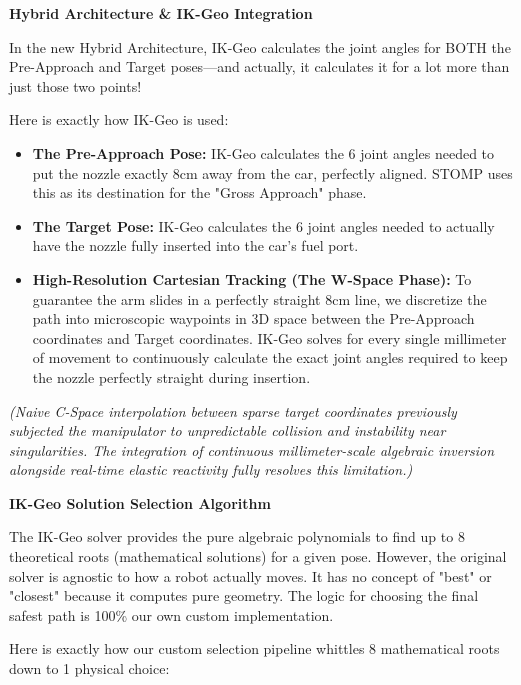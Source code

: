 \documentclass[11pt, a4paper]{article}
\begin{document}
\vspace{0.4cm}
{\Large\textbf{Hybrid Architecture \& IK-Geo Integration}}

In the new Hybrid Architecture, IK-Geo calculates the joint angles for BOTH the Pre-Approach and Target poses—and actually, it calculates it for a lot more than just those two points!

Here is exactly how IK-Geo is used:

\begin{itemize}
    \item \textbf{The Pre-Approach Pose:} IK-Geo calculates the 6 joint angles needed to put the nozzle exactly 8cm away from the car, perfectly aligned. STOMP uses this as its destination for the "Gross Approach" phase.
    \item \textbf{The Target Pose:} IK-Geo calculates the 6 joint angles needed to actually have the nozzle fully inserted into the car's fuel port.
    \item \textbf{High-Resolution Cartesian Tracking (The W-Space Phase):} To guarantee the arm slides in a perfectly straight 8cm line, we discretize the path into microscopic waypoints in 3D space between the Pre-Approach coordinates and Target coordinates. IK-Geo solves for every single millimeter of movement to continuously calculate the exact joint angles required to keep the nozzle perfectly straight during insertion.
\end{itemize}

\textit{(Naive C-Space interpolation between sparse target coordinates previously subjected the manipulator to unpredictable collision and instability near singularities. The integration of continuous millimeter-scale algebraic inversion alongside real-time elastic reactivity fully resolves this limitation.)}

\vspace{0.4cm}
{\Large\textbf{IK-Geo Solution Selection Algorithm}}

The IK-Geo solver provides the pure algebraic polynomials to find up to 8 theoretical roots (mathematical solutions) for a given pose. However, the original solver is agnostic to how a robot actually moves. It has no concept of "best" or "closest" because it computes pure geometry. The logic for choosing the final safest path is 100\% our own custom implementation.

Here is exactly how our custom selection pipeline whittles 8 mathematical roots down to 1 physical choice:
\end{document}
